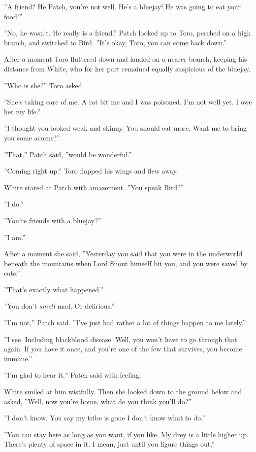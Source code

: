 \documentclass[11pt]{article}
\begin{document}
 ''A friend? He %
 Patch, you're not well. He's a bluejay! He was going to eat your food!''\par
 ''No, he wasn't. He really is a friend.'' Patch looked up to Toro, perched on a high branch, and switched to Bird. ''It's okay, Toro, you can come back down.''\par
 After a moment Toro fluttered down and landed on a nearer branch, keeping his distance from White, who for her part remained equally suspicious of the bluejay.\par
 ''Who is she?'' Toro asked.\par
 ''She's taking care of me. A rat bit me and I was poisoned. I'm not well yet. I owe her my life.''\par
 ''I thought you looked weak and skinny. You should eat more. Want me to bring you some acorns?''\par
 ''That,'' Patch said, ''would be wonderful.''\par
 ''Coming right up.'' Toro flapped his wings and flew away.\par
 White stared at Patch with amazement. ''You speak Bird?''\par
 ''I do.''\par
 ''You're friends with a bluejay?''\par
 ''I am.''\par
 After a moment she said, ''Yesterday you said that you were in the underworld beneath the mountains when Lord Snout himself bit you, and you were saved by cats.''\par
 ''That's exactly what happened.''\par
 ''You don't {\it smell} mad. Or delirious.''\par
 ''I'm not,'' Patch said. ''I've just had rather a lot of things happen to me lately.''\par
 ''I see. Including blackblood disease. Well, you won't have to go through that again. If you have it once, and you're one of the few that survives, you become immune.''\par
 ''I'm glad to hear it,'' Patch said with feeling.\par
 White smiled at him wistfully. Then she looked down to the ground below and asked, ''Well, now you're home, what do you think you'll do?''\par
 ''I don't know. You say my tribe is gone %
 I don't know what to do.''\par
 ''You can stay here as long as you want, if you like. My drey is a little higher up. There's plenty of space in it. I mean, just until you figure things out.''\par
\end{document}
